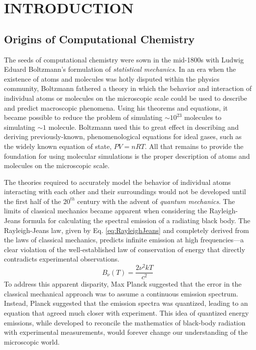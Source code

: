 \chapter{INTRODUCTION}

\section{Origins of Computational Chemistry}
The seeds of computational chemistry were sown in the mid-1800s with Ludwig
Eduard Boltzmann's formulation of \textit{statistical mechanics}. In an era when
the existence of atoms and molecules was hotly disputed within the physics
community, Boltzmann fathered a theory in which the behavior and interaction of
individual atoms or molecules on the microscopic scale could be used to
describe and predict macroscopic phenomena. Using his theorems and equations,
it became possible to reduce the problem of simulating $\sim 10^{23}$ molecules
to simulating $\sim 1$ molecule. Boltzmann used this to great effect in
describing and deriving previously-known, phenomenological equations for ideal
gases, such as the widely known equation of state, $P V = n R T$. All that
remains to provide the foundation for using molecular simulations is the proper
description of atoms and molecules on the microscopic scale.

The theories required to accurately model the behavior of individual atoms
interacting with each other and their surroundings would not be developed until
the first half of the $20^{th}$ century with the advent of \textit{quantum
mechanics}. The limits of classical mechanics became apparent when considering
the Rayleigh-Jeans formula for calculating the spectral emission of a radiating
black body. The Rayleigh-Jeans law, given by Eq. \ref{eq:RayleighJeans} and
completely derived from the laws of classical mechanics, predicts infinite
emission at high frequencies---a clear violation of the well-established law of
conservation of energy that directly contradicts experimental observations.
\begin{equation}
   B_{\nu} (T)  = \frac{2 \nu^2 k T} {c^2}
   \label{eq:RayleighJeans}
\end{equation}
To address this apparent disparity, Max Planck suggested that the error in the
classical mechanical approach was to assume a continuous emission spectrum.
Instead, Planck suggested that the emission spectra was quantized, leading to an
equation that agreed much closer with experiment. This idea of quantized energy
emissions, while developed to reconcile the mathematics of black-body radiation
with experimental measurements, would forever change our understanding of the
microscopic world.

